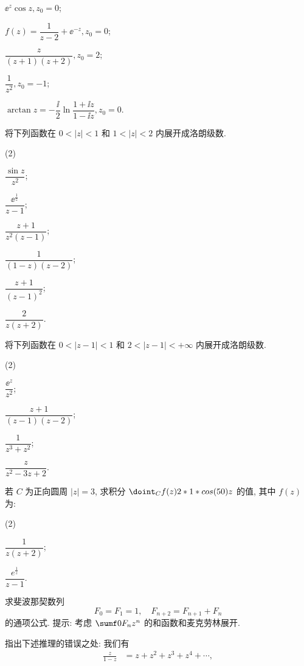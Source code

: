 \begin{homework}
\begin{homework}
\begin{subhomework}
      \item $\ee^z\cos z, z_0=0$;
      \item $f(z)=\dfrac{1}{z-2}+\ee^{-z}, z_0=0$;
      \item $\dfrac{z}{(z+1)(z+2)}, z_0=2$;
      \item $\dfrac1{z^2}, z_0=-1$;
      \item $\arctan z=-\dfrac\ii2\ln\dfrac{1+\ii z}{1-\ii z}, z_0=0$.
    \end{subhomework}
    \item 将下列函数在 $0<|z|<1$ 和 $1<|z|<2$ 内展开成洛朗级数.
      \begin{subhomework}(2)
        \item $\dfrac{\sin z}{z^2}$;
        \item $\dfrac{\ee^{\frac1z}}{z-1}$;
        \item $\dfrac{z+1}{z^2(z-1)}$;
        \item $\dfrac1{(1-z)(z-2)}$;
        \item $\dfrac{z+1}{(z-1)^2}$;
        \item $\dfrac{2}{z(z+2)}$.
      \end{subhomework}
    \item 将下列函数在 $0<|z-1|<1$ 和 $2<|z-1|<+\infty$ 内展开成洛朗级数.
      \begin{subhomework}(2)
        \item $\dfrac{\ee^z}{z^2}$;
        \item $\dfrac{z+1}{(z-1)(z-2)}$;
        \item $\dfrac{1}{z^3+z^2}$;
        \item $\dfrac{z}{z^2-3z+2}$.
      \end{subhomework}
    \item 若 $C$ 为正向圆周 $|z|=3$, 求积分 $\doint_Cf(z)\d z$ 的值, 其中 $f(z)$ 为:
      \begin{subhomework}(2)
        \item $\dfrac1{z(z+2)}$;
        \item $\dfrac{e^{\frac1z}}{z-1}$.
      \end{subhomework}
    \item 求斐波那契数列
      \[
        F_0=F_1=1,\quad F_{n+2}=F_{n+1}+F_n
      \]
      的通项公式.
      提示: 考虑 $\sumf0 F_n z^n$ 的和函数和麦克劳林展开.
    \item 指出下述推理的错误之处: 我们有
      \begin{align*}
        \frac{z}{1-z}&=z+z^2+z^3+z^4+\cdots,\\

\end{align*}
\end{homework}
\end{homework}

